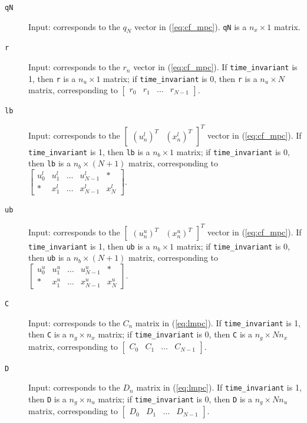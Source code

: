 \documentclass[a4paper]{report}
\begin{document}
\begin{description}
\item[\tt qN] Input: corresponds to the $q_N$ vector in (\ref{eq:cf_mpc}).
{\tt qN} is a $n_x\times 1$ matrix.

\item[\tt r] Input: corresponds to the $r_n$ vector in (\ref{eq:cf_mpc}).
If {\tt time\_invariant} is 1, then {\tt r} is a $n_u\times 1$ matrix; if {\tt time\_invariant} is 0, then {\tt r} is a $n_u\times N$ matrix, corresponding to $\begin{bmatrix} r_0 & r_1 & \dots & r_{N-1} \end{bmatrix}$.

\item[\tt lb] Input: corresponds to the $\begin{bmatrix} (u_n^l)^T & (x_n^l)^T \end{bmatrix}^T$ vector in (\ref{eq:cf_mpc}).
If {\tt time\_invariant} is 1, then {\tt lb} is a $n_b\times 1$ matrix; if {\tt time\_invariant} is 0, then {\tt lb} is a $n_b\times (N+1)$ matrix, corresponding to $\begin{bmatrix} u^l_0 & u^l_1 & \dots & u^l_{N-1} & * \\ * & x^l_1 & \dots & x^l_{N-1} & x^l_N \end{bmatrix}$.

\item[\tt ub] Input: corresponds to the $\begin{bmatrix} (u_n^u)^T & (x_n^u)^T \end{bmatrix}^T$ vector in (\ref{eq:cf_mpc}).
If {\tt time\_invariant} is 1, then {\tt ub} is a $n_b\times 1$ matrix; if {\tt time\_invariant} is 0, then {\tt ub} is a $n_b\times (N+1)$ matrix, corresponding to $\begin{bmatrix} u^u_0 & u^u_1 & \dots & u^u_{N-1} & * \\ * & x^u_1 & \dots & x^u_{N-1} & x^u_N \end{bmatrix}$.

\item[\tt C] Input: corresponds to the $C_n$ matrix in (\ref{eq:lmpc}).
If {\tt time\_invariant} is 1, then {\tt C} is a $n_g\times n_x$ matrix; if {\tt time\_invariant} is 0, then {\tt C} is a $n_g\times Nn_x$ matrix, corresponding to $\begin{bmatrix} C_0 & C_1 & \dots & C_{N-1} \end{bmatrix}$.

\item[\tt D] Input: corresponds to the $D_n$ matrix in (\ref{eq:lmpc}).
If {\tt time\_invariant} is 1, then {\tt D} is a $n_g\times n_u$ matrix; if {\tt time\_invariant} is 0, then {\tt D} is a $n_g\times Nn_u$ matrix, corresponding to $\begin{bmatrix} D_0 & D_1 & \dots & D_{N-1} \end{bmatrix}$.


\end{description}
\end{document}
